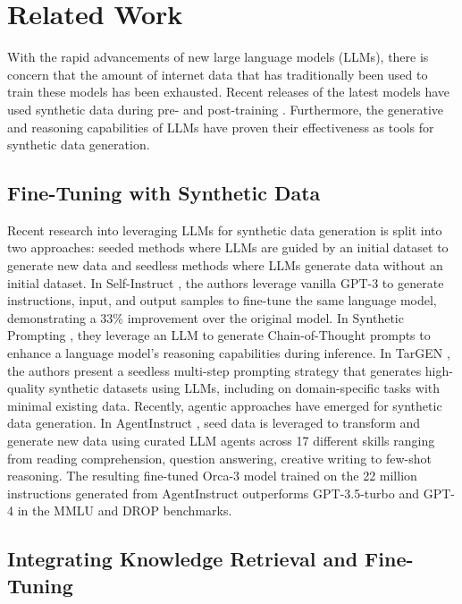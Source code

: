 \section{Related Work}

With the rapid advancements of new large language models (LLMs), there is
concern that the amount of internet data that has traditionally been used to
train these models has been exhausted. Recent releases of the latest models
have used synthetic data during pre- and post-training \citep{abdin_phi-3_2024,
dubey_llama_2024, bai_qwen_2023}. Furthermore, the generative and reasoning
capabilities of LLMs have proven their effectiveness as tools for synthetic data
generation.

\subsection{Fine-Tuning with Synthetic Data}

Recent research into leveraging LLMs for synthetic data generation is split
into two approaches: seeded methods where LLMs are guided by an initial dataset
to generate new data and seedless methods where LLMs generate data without an
initial dataset. In Self-Instruct \citep{wang_self-instruct_2023}, the authors
leverage vanilla GPT-3 to generate instructions, input, and output samples to
fine-tune the same language model, demonstrating a 33\% improvement over the
original model. In Synthetic Prompting \cite{shao_synthetic_2023}, they leverage
an LLM to generate Chain-of-Thought prompts to enhance a language model’s
reasoning capabilities during inference. In TarGEN \citep{gupta2023targen}, the
authors present a seedless multi-step prompting strategy that generates
high-quality synthetic datasets using LLMs, including on domain-specific tasks
with minimal existing data.
Recently, agentic approaches have emerged for synthetic data generation.
In AgentInstruct \citep{mitra_agentinstruct_2024}, seed
data is leveraged to transform and generate new data using curated LLM agents
across 17 different skills ranging from reading comprehension, question
answering, creative writing to few-shot reasoning. The resulting fine-tuned
Orca-3 model trained on the 22 million instructions generated from AgentInstruct
outperforms GPT-3.5-turbo and GPT-4 in the MMLU and DROP benchmarks.

\subsection{Integrating Knowledge Retrieval and Fine-Tuning}


